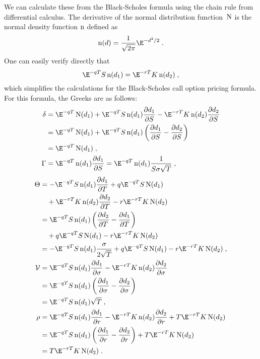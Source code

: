 We can calculate these from the Black-Scholes formula using the chain rule from differential calculus.  The derivative of the normal distribution function~$\operatorname{N}$ is the normal density function $\operatorname{n}$ defined as
$$\nd(d) = \frac{1}{\sqrt{2\pi}}\E^{-d^2/2}\; .$$
One can easily verify directly that
\begin{equation}\label{greeksimplify}
\E^{-q T}S\nd(d_1)=\E^{-rT}K\nd(d_2)\;,
\end{equation}
which simplifies the calculations for the Black-Scholes call option pricing formula. 
For this formula, the Greeks are as follows:
\begin{align*}
\delta &= \E^{-q T}\N(d_1) + \E^{-q T}S\nd(d_1)\frac{\partial d_1}{\partial S} -\E^{-rT}K\nd(d_2)\frac{\partial d_2}{\partial S}\\
&= \E^{-q T}\N(d_1) + \E^{-q T}S\nd(d_1)\left(\frac{\partial d_1}{\partial S}-\frac{\partial d_2}{\partial S}\right)\\
&=\E^{-q T}\N(d_1)\;,\\ 
\Gamma &=\E^{-q T}\nd(d_1)\frac{\partial d_1}{\partial S}= \E^{-q T}\nd(d_1)\frac{1}{S\sigma\sqrt{T}}\;,
\end{align*}
\begin{align*}
 \Theta &=-\E^{-q T}S\nd(d_1)\frac{\partial d_1}{\partial T} +q \E^{-q T}S\N(d_1) \\
&\quad + \E^{-rT}K\nd(d_2)\frac{\partial d_2}{\partial T} -r\E^{-rT}K\N(d_2)\\
&=\E^{-q T}S\nd(d_1)\left(\frac{\partial d_2}{\partial T}-\frac{\partial d_1}{\partial T}\right)\\
&\quad + q \E^{-q T}S\N(d_1)-r\E^{-rT}K\N(d_2)\\
&=-\E^{-q T}S\nd(d_1)\frac{\sigma}{2\sqrt{T}}+ q \E^{-q T}S\N(d_1)-r\E^{-rT}K\N(d_2)\;,\\
 \cal{V}&=\E^{-q T}S\nd(d_1)\frac{\partial d_1}{\partial \sigma} - \E^{-rT}K\nd(d_2)\frac{\partial d_2}{\partial \sigma}\\
&=\E^{-q T}S\nd(d_1)\left(\frac{\partial d_1}{\partial \sigma}-\frac{\partial d_2}{\partial \sigma}\right)\\
&=\E^{-q T}S\nd(d_1)\sqrt{T}\;,\\
 \rho &=\E^{-q T}S\nd(d_1)\frac{\partial d_1}{\partial r} - \E^{-rT}K\nd(d_2)\frac{\partial d_2}{\partial r} +T\E^{-rT}K\N(d_2)\\
&=\E^{-q T}S\nd(d_1)\left(\frac{\partial d_1}{\partial r}-\frac{\partial d_2}{\partial r}\right)+T\E^{-rT}K\N(d_2)\\
&=T\E^{-rT}K\N(d_2)\;.
\end{align*} 


